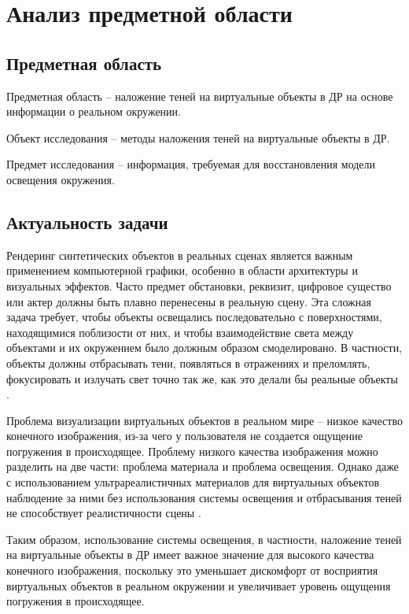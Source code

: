 \chapter{Анализ предметной области}

\section{Предметная область}

Предметная область -- наложение теней  на виртуальные объекты в ДР на основе информации о реальном окружении.

Объект исследования -- методы наложения теней  на виртуальные объекты в ДР.

Предмет исследования -- информация, требуемая для восстановления модели освещения окружения.

\section{Актуальность задачи}

Рендеринг синтетических объектов в реальных сценах является важным применением компьютерной графики, особенно в области архитектуры и визуальных эффектов. Часто предмет обстановки, реквизит, цифровое существо или актер должны быть плавно перенесены в реальную сцену. Эта сложная задача требует, чтобы объекты освещались последовательно с поверхностями, находящимися поблизости от них, и чтобы взаимодействие света между объектами и их окружением было должным образом смоделировано. В частности, объекты должны отбрасывать тени, появляться в отражениях и преломлять, фокусировать и излучать свет точно так же, как это делали бы реальные объекты \cite{debevec2008rendering}.

Проблема визуализации виртуальных объектов в реальном мире -- низкое качество конечного изображения, из-за чего у пользователя не создается ощущение погружения в происходящее. Проблему низкого качества изображения можно разделить на две части: проблема материала и проблема освещения. Однако даже с использованием ультрареалистичных материалов для виртуальных объектов наблюдение за ними без использования системы освещения и отбрасывания теней не способствует реалистичности сцены \cite{osti2019real}.

Таким образом, использование системы освещения, в частности, наложение теней на виртуальные объекты в ДР имеет важное значение для высокого качества конечного изображения, поскольку это уменьшает дискомфорт от восприятия виртуальных объектов в реальном окружении и увеличивает уровень ощущения погружения в происходящее.


